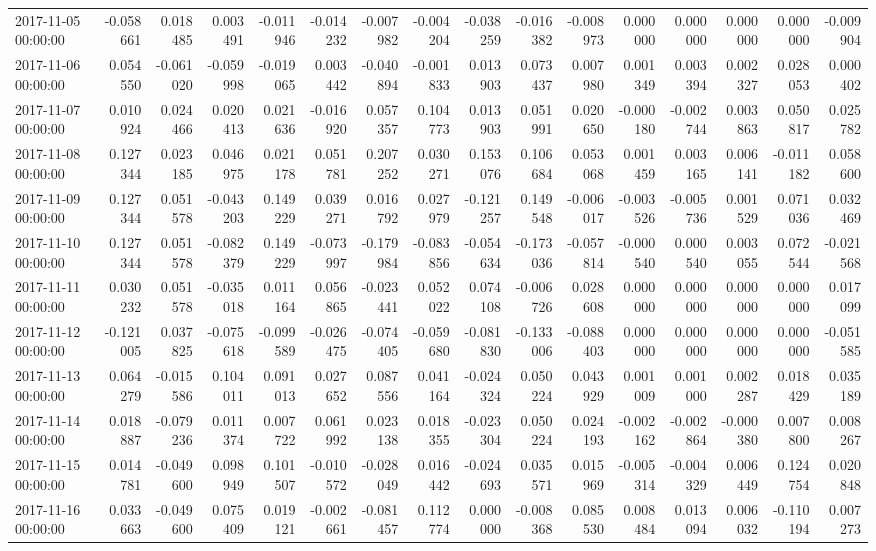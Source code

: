 \begin{tabular}{lrrrrrrrrrrrrrrr}
2017-11-05 00:00:00 & -0.058661 & 0.018485 & 0.003491 & -0.011946 & -0.014232 & -0.007982 & -0.004204 & -0.038259 & -0.016382 & -0.008973 & 0.000000 & 0.000000 & 0.000000 & 0.000000 & -0.009904 \\
2017-11-06 00:00:00 & 0.054550 & -0.061020 & -0.059998 & -0.019065 & 0.003442 & -0.040894 & -0.001833 & 0.013903 & 0.073437 & 0.007980 & 0.001349 & 0.003394 & 0.002327 & 0.028053 & 0.000402 \\
2017-11-07 00:00:00 & 0.010924 & 0.024466 & 0.020413 & 0.021636 & -0.016920 & 0.057357 & 0.104773 & 0.013903 & 0.051991 & 0.020650 & -0.000180 & -0.002744 & 0.003863 & 0.050817 & 0.025782 \\
2017-11-08 00:00:00 & 0.127344 & 0.023185 & 0.046975 & 0.021178 & 0.051781 & 0.207252 & 0.030271 & 0.153076 & 0.106684 & 0.053068 & 0.001459 & 0.003165 & 0.006141 & -0.011182 & 0.058600 \\
2017-11-09 00:00:00 & 0.127344 & 0.051578 & -0.043203 & 0.149229 & 0.039271 & 0.016792 & 0.027979 & -0.121257 & 0.149548 & -0.006017 & -0.003526 & -0.005736 & 0.001529 & 0.071036 & 0.032469 \\
2017-11-10 00:00:00 & 0.127344 & 0.051578 & -0.082379 & 0.149229 & -0.073997 & -0.179984 & -0.083856 & -0.054634 & -0.173036 & -0.057814 & -0.000540 & 0.000540 & 0.003055 & 0.072544 & -0.021568 \\
2017-11-11 00:00:00 & 0.030232 & 0.051578 & -0.035018 & 0.011164 & 0.056865 & -0.023441 & 0.052022 & 0.074108 & -0.006726 & 0.028608 & 0.000000 & 0.000000 & 0.000000 & 0.000000 & 0.017099 \\
2017-11-12 00:00:00 & -0.121005 & 0.037825 & -0.075618 & -0.099589 & -0.026475 & -0.074405 & -0.059680 & -0.081830 & -0.133006 & -0.088403 & 0.000000 & 0.000000 & 0.000000 & 0.000000 & -0.051585 \\
2017-11-13 00:00:00 & 0.064279 & -0.015586 & 0.104011 & 0.091013 & 0.027652 & 0.087556 & 0.041164 & -0.024324 & 0.050224 & 0.043929 & 0.001009 & 0.001000 & 0.002287 & 0.018429 & 0.035189 \\
2017-11-14 00:00:00 & 0.018887 & -0.079236 & 0.011374 & 0.007722 & 0.061992 & 0.023138 & 0.018355 & -0.023304 & 0.050224 & 0.024193 & -0.002162 & -0.002864 & -0.000380 & 0.007800 & 0.008267 \\
2017-11-15 00:00:00 & 0.014781 & -0.049600 & 0.098949 & 0.101507 & -0.010572 & -0.028049 & 0.016442 & -0.024693 & 0.035571 & 0.015969 & -0.005314 & -0.004329 & 0.006449 & 0.124754 & 0.020848 \\
2017-11-16 00:00:00 & 0.033663 & -0.049600 & 0.075409 & 0.019121 & -0.002661 & -0.081457 & 0.112774 & 0.000000 & -0.008368 & 0.085530 & 0.008484 & 0.013094 & 0.006032 & -0.110194 & 0.007273 \\

\end{tabular}
